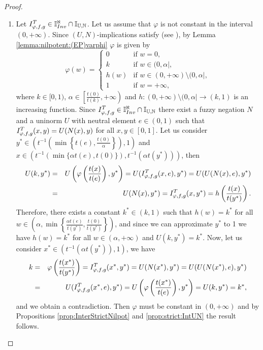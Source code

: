 \begin{proof}~~
	\begin{enumerate}[label=(\roman*)]
		\item Let $I^T_{\varphi,f,g} \in \mathbb{I}^{\aleph}_{Inv} \cap \mathbb{I}_{\mathbb{U},\mathbb{N}}$. Let us assume that $\varphi$ is not constant in the interval $(0,+\infty)$. Since $(U,N)$-implications satisfy \EP (see \cite[Proposition~5.3.2]{Baczynski2008}), by Lemma  \ref{lemma:nilpotent:(EP)varphi} $\varphi$ is given by
		$$
		\varphi(w)
		=
		\left\{ \begin{array}{ll}
			0 &   \text{if }   w=0, \\
			k &   \text{if }   w \in (0,\alpha|, \\
			h(w) &   \text{if }   w \in (0,+\infty) \setminus (0,\alpha|, \\
			1 &   \text{if }   w=+\infty,
		\end{array}
		\right.
		$$
		where $k \in [0,1)$, $\alpha \in \left[\frac{t(0)}{t(k)},+\infty\right)$ and $h:(0,+\infty) \setminus (0,\alpha| \to (k,1)$ is an increasing function. Since $I^T_{\varphi,f,g} \in \mathbb{I}^{\aleph}_{Inv} \cap \mathbb{I}_{\mathbb{U},\mathbb{N}}$ there exist a fuzzy negation $N$ and a uninorm $U$ with neutral element $e \in (0,1)$ such that $I^T_{\varphi,f,g}(x,y)=U(N(x),y)$ for all $x,y \in [0,1]$. Let us consider $y^* \in \left(t^{-1}\left(\min \left\{t(e),\frac{t(0)}{\alpha}\right\} \right),1\right)$ and $x \in (t^{-1}(\min\{\alpha t(e),t(0)\}),t^{-1}(\alpha t(y^*)))$, then 
		\begin{eqnarray*}
			U(k,y^*) &=& U \left(\varphi \left(\frac{t(x)}{t(e)}\right),y^*\right) = U(I^T_{\varphi,f,g}(x,e),y^*) = U(U(N(x),e),y^*) \\
			&=& U(N(x),y^*)=I^T_{\varphi,f,g}(x,y^*)=h \left(\frac{t(x)}{t(y^*)}\right).
		\end{eqnarray*}
		Therefore, there exists a constant $k^* \in (k,1)$ such that $h(w)=k^*$ for all $w \in \left(\alpha, \min \left\{\frac{\alpha t(e)}{t(y^*)},\frac{t(0)}{t(y^*)}\right\}\right)$, and since we can approximate $y^*$ to 1 we have $h(w)=k^*$ for all $w \in (\alpha,+\infty)$ and $U(k,y^*)=k^*$. Now, let us consider $x^* \in (t^{-1}(\alpha t(y^*)),1)$, we have
		\begin{eqnarray*}
			k &=& \varphi \left(\frac{t(x^*)}{t(y^*)}\right)=I^T_{\varphi,f,g}(x^*,y^*)=U(N(x^*),y^*)  = U(U(N(x^*),e),y^*) \\
			&=& U(I^T_{\varphi,f,g}(x^*,e),y^*)= U \left(\varphi \left(\frac{t(x^*)}{t(e)}\right),y^*\right)=U(k,y^*)=k^*,
		\end{eqnarray*}
		and we obtain a contradiction. Then $\varphi$ must be constant in $(0,+\infty)$ and by Propositions \ref{prop:InterStrictNilpot} and \ref{prop:strict:IntUN} the result follows.

\end{enumerate}
\end{proof}
